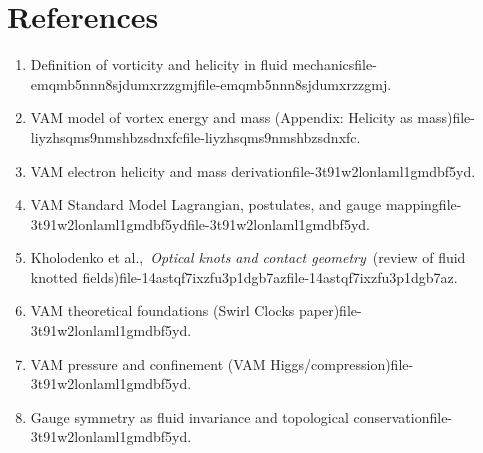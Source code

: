 \documentclass[a4paper,12pt]{article}
\begin{document}
\section*{References}
\begin{enumerate}
\item Definition of vorticity and helicity in fluid mechanicsfile-emqmb5nnn8sjdumxrzzgmjfile-emqmb5nnn8sjdumxrzzgmj.


\item VAM model of vortex energy and mass (Appendix: Helicity as mass)file-liyzhsqms9nmshbzsdnxfcfile-liyzhsqms9nmshbzsdnxfc.


\item VAM electron helicity and mass derivationfile-3t91w2lonlaml1gmdbf5yd.


\item VAM Standard Model Lagrangian, postulates, and gauge mappingfile-3t91w2lonlaml1gmdbf5ydfile-3t91w2lonlaml1gmdbf5yd.


\item Kholodenko et al., \textit{Optical knots and contact geometry} (review of fluid knotted fields)file-14astqf7ixzfu3p1dgb7azfile-14astqf7ixzfu3p1dgb7az.


\item VAM theoretical foundations (Swirl Clocks paper)file-3t91w2lonlaml1gmdbf5yd.


\item VAM pressure and confinement (VAM Higgs/compression)file-3t91w2lonlaml1gmdbf5yd.


\item Gauge symmetry as fluid invariance and topological conservationfile-3t91w2lonlaml1gmdbf5yd.


\end{enumerate}
\end{document}
